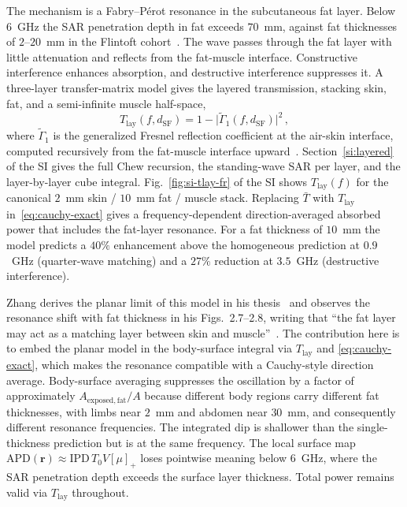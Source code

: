 \documentclass[journal,twocolumn,10pt]{IEEEtran}
\theoremstyle{plain}
\newcommand{\rr}{\mathbf{r}}
\newcommand{\IPD}{\mathrm{IPD}}
\newcommand{\APD}{\mathrm{APD}}
\newcommand{\Tbar}{\bar{T}}
\newcommand{\Tlay}{T_{\mathrm{lay}}}
\newcommand{\pospart}[1]{\left[#1\right]_{+}}
\newcommand{\Vis}{V}
\begin{document}
The mechanism is a Fabry--P\'erot resonance in the subcutaneous fat
layer. Below $6$~GHz the SAR penetration depth in fat exceeds
$70$~mm, against fat thicknesses of $2$--$20$~mm in the Flintoft
cohort~\cite[Table~1]{Flintoft2014}. The wave passes through the fat
layer with little attenuation and reflects from the fat-muscle
interface. Constructive interference enhances absorption, and destructive
interference suppresses it. A three-layer transfer-matrix model gives the layered transmission,
stacking skin, fat, and a semi-infinite muscle half-space,
\begin{equation}\label{eq:T-lay}
  \Tlay(f, d_{\mathrm{SF}})
  = 1 - \bigl|\widetilde{\Gamma}_1(f, d_{\mathrm{SF}})\bigr|^2\, ,
\end{equation}
where $\widetilde{\Gamma}_1$ is the generalized Fresnel reflection
coefficient at the air-skin interface, computed recursively from the
fat-muscle interface upward~\cite{Chew1995,BornWolf1999}.
Section~\ref{si:layered} of the SI gives the full Chew recursion,
the standing-wave SAR per layer, and the layer-by-layer cube
integral. Fig.~\ref{fig:si-tlay-fr} of the SI shows $\Tlay(f)$ for
the canonical $2$~mm skin / $10$~mm fat / muscle stack. Replacing
$\Tbar$ with $\Tlay$ in~\eqref{eq:cauchy-exact} gives a
frequency-dependent direction-averaged absorbed power that includes
the fat-layer resonance. For a fat thickness of $10$~mm the model
predicts a $40\%$ enhancement above the homogeneous prediction at
$0.9$~GHz (quarter-wave matching) and a $27\%$ reduction at
$3.5$~GHz (destructive interference).

Zhang derives the planar limit of this model in his
thesis~\cite[Sec.~2.2]{Zhang2017thesis} and observes the resonance
shift with fat thickness in his Figs.~2.7--2.8, writing that ``the
fat layer may act as a matching layer between skin and
muscle''~\cite[p.~21]{Zhang2017thesis}. The contribution here is to
embed the planar model in the body-surface integral via $\Tlay$ and
\eqref{eq:cauchy-exact}, which makes the resonance compatible with a
Cauchy-style direction average. Body-surface averaging suppresses
the oscillation by a factor of approximately
$A_{\mathrm{exposed,fat}}/A$ because different body regions carry
different fat thicknesses, with limbs near $2$~mm and abdomen near
$30$~mm, and consequently different resonance frequencies. The
integrated dip is shallower than the single-thickness prediction but
is at the same frequency. The local surface map
$\APD(\rr) \approx \IPD\,T_0 \Vis \pospart{\mu}$ loses pointwise
meaning below $6$~GHz, where the SAR penetration depth exceeds the
surface layer thickness. Total power remains valid via $\Tlay$
throughout.
\end{document}

